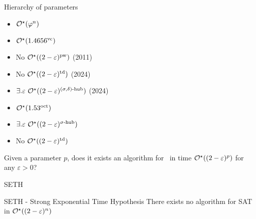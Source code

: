 \begin{frame}{Hierarchy of parameters}
    \begin{minipage}{0.5\textwidth}
        \centering
        
    \end{minipage}
    \begin{minipage}{0.47\textwidth}
        \begin{itemize}
            \item<3-> $\mathcal{O}^\star(\varphi^n)$
            \item<4-> $\mathcal{O}^\star(1.4656^{\text{vc}})$
            \item<5-> No $\mathcal{O}^\star((2 - \varepsilon)^{\text{pw}})$ (2011)
            \item<6-> No $\mathcal{O}^\star((2 - \varepsilon)^{\text{td}})$ (2024)
            \item<7-> $\exists. \varepsilon\ \mathcal{O}^\star((2 - \varepsilon)^{(\sigma, \delta)\text{-hub}})$ (2024)
        \end{itemize}

        \medskip

        \begin{itemize}
            \item<8-> \color{red} $\mathcal{O}^\star(1.53^{\text{oct}})$
            \item<9-> \color{red} $\exists. \varepsilon\ \mathcal{O}^\star((2 - \varepsilon)^{\sigma\text{-hub}})$
            \item<10-> \color{red} No $\mathcal{O}^\star((2 - \varepsilon)^{\text{td}})$
        \end{itemize}
    \end{minipage}

    \medskip

    \pause 

    Given a parameter $p$, does it exists an algorithm for \IS\ in time $\mathcal{O}^\star((2-\varepsilon)^p)$ for any $\varepsilon > 0$?
\end{frame}

\begin{frame}{SETH}
    \begin{alertblock}{SETH - Strong Exponential Time Hypothesis}
        There exists no algorithm for SAT in $\mathcal{O}^\star((2-\varepsilon)^n)$
    \end{alertblock}
\end{frame}